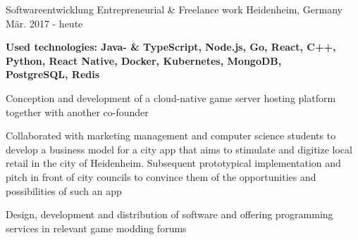\begin{cventries}

  \cventry
    {Softwareentwicklung} %
    {\faUser{} Entrepreneurial \& Freelance work} %
    {Heidenheim, Germany} %
    {Mär. 2017 - heute} %
    {
      \begin{cvitems} %
        {\scriptsize\textbf{Used technologies: Java- \& TypeScript, Node.js, Go, React, C++, Python, React Native, Docker, Kubernetes, MongoDB,\\ PostgreSQL, Redis}}
        \item {}
        \item {Conception and development of a cloud-native game server hosting platform together with another co-founder}
        \item {Collaborated with marketing management and computer science students to develop a business model for a city app that aims to stimulate and digitize local retail in the city of Heidenheim. Subsequent prototypical implementation and pitch in front of city councils to convince them of the opportunities and possibilities of such an app}
        \item {Design, development and distribution of software and offering programming services in relevant game modding forums}
      \end{cvitems}
    }

\end{cventries}
